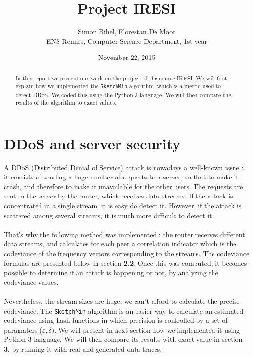\documentclass[a4paper]{article}%
\begin{document}
\title{Project IRESI}

\author{Simon Bihel, Florestan De Moor \\ ENS Rennes, Computer Science Department, 1st year}

\date{November 22, 2015}

\maketitle

\begin{abstract}
	In this report we present our work on the project of the course IRESI. We will first explain how we implemented the \texttt{SketchMin} algorithm, which is a metric used to detect DDoS. We coded this using the Python 3 language. We will then compare the results of the algorithm to exact values.
\end{abstract}


\section{DDoS and server security}

\paragraph{}A DDoS (Distributed Denial of Service) attack is nowadays a well-known issue : it consists of sending a huge number of requests to a server, so that to make it crash, and therefore to make it unavailable for the other users. The requests are sent to the server by the router, which receives data streams. If the attack is concentrated in a single stream, it is easy do detect it. However, if the attack is scattered among several streams, it is much more difficult to detect it.

\paragraph{}That's why the following method was implemented : the router receives different data streams, and calculates for each peer a correlation indicator which is the codeviance of the frequency vectors corresponding to the streams. The codeviance formulas are presented below in section \textbf{2.2}. Once this was computed, it becomes possible to determine if an attack is happening or not, by analyzing the codeviance values.

\paragraph{}Nevertheless, the stream sizes are huge, we can't afford to calculate the precise codeviance. The \texttt{SketchMin} algorithm is an easier way to calculate an estimated codeviance using hash functions in which precision is controlled by a set of paramaters ($\varepsilon, \delta)$. We will present in next section how we implemented it using Python 3 language. We will then compare its results with exact value in section \textbf{3}, by running it with real and generated data traces.
\end{document}
